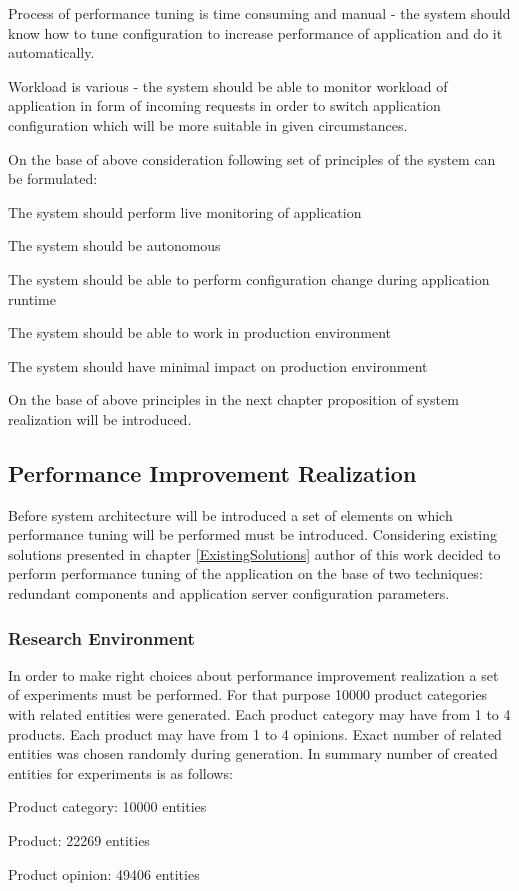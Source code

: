 \documentclass[10pt,a4paper]{article}
\let\tempone\itemize
\let\temptwo\enditemize
\renewenvironment{itemize}{\tempone\addtolength{\itemsep}{-0.4\baselineskip}}{\temptwo}
\begin{document}
Process of performance tuning is time consuming and manual - the system should know how to tune configuration to increase performance of application and do it automatically. 

Workload is various - the system should be able to monitor workload of application in form of incoming requests in order to switch application configuration which will be more suitable in given circumstances. 

On the base of above consideration following set of principles of the system can be formulated:

\begin{itemize}
\item The system should perform live monitoring of application
\item The system should be autonomous
\item The system should be able to perform configuration change during application runtime
\item The system should be able to work in production environment
\item The system should have minimal impact on production environment
\end{itemize}

On the base of above principles in the next chapter proposition of system realization will be introduced.  

\subsection{Performance Improvement Realization} \label{realization}

Before system architecture will be introduced a set of elements on which performance tuning will be performed must be introduced.  
Considering existing solutions presented in chapter \ref{ExistingSolutions} author of this work decided to perform performance tuning of the application on the base of two techniques: redundant components and application server configuration parameters. 

\subsubsection{Research Environment}

In order to make right choices about performance improvement realization a set of experiments must be performed. 
For that purpose 10000 product categories with related entities were generated. Each product category may have from 1 to 4 products. Each product may have from 1 to 4 opinions. Exact number of related entities was chosen randomly during generation. In summary number of created entities for experiments is as follows:
\begin{itemize}
\item Product category: 10000 entities
\item Product: 22269 entities
\item Product opinion: 49406 entities
\end{itemize}  
\end{document}
